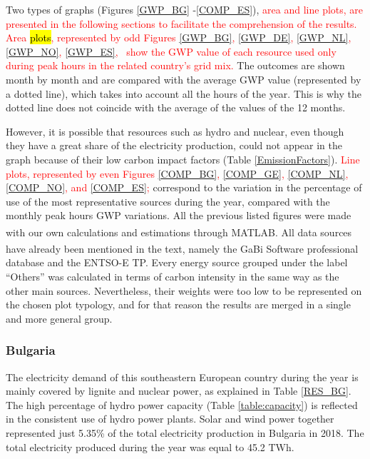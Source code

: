 Two types of graphs (Figures \ref{GWP_BG} -\ref{COMP_ES}), \textcolor{red}{area and line plots, are presented in the following sections to facilitate the comprehension of the results. Area \hl{plots}, represented by odd Figures \ref{GWP_BG}, \ref{GWP_DE}, \ref{GWP_NL}, \ref{GWP_NO}, \ref{GWP_ES}, 
~show the GWP value of each resource used only during peak hours in the related country's grid mix.} The outcomes are shown month by month and are compared with the average GWP value (represented by a dotted line), which takes into account all the hours of the year. This is why the dotted line does not coincide with the average of the values of the 12 months. %

However, it is possible that resources such as hydro and nuclear, even though they have a great share of the electricity production,  could not appear in the graph because of their low carbon impact factors (Table \ref{EmissionFactors}). \textcolor{red}{Line plots, represented by even Figures \ref{COMP_BG}, \ref{COMP_GE}, \ref{COMP_NL}, \ref{COMP_NO}, and \ref{COMP_ES};} correspond to the variation in the percentage of use of the most representative sources during the year, compared with the monthly peak hours GWP variations. {All the previous listed figures were made with our own calculations and estimations through MATLAB\textsuperscript{\textregistered}. All data sources have already been mentioned in the text, namely the  GaBi\textsuperscript{\textregistered} Software professional database and the ENTSO-E TP.} {Every energy source grouped under the label ``Others'' was calculated in terms of carbon intensity in the same way as the other main sources. Nevertheless, their weights were too low to be represented on the chosen plot typology, and for that reason the results are merged in a single and more general group}.\\





\subsubsection{Bulgaria}
The electricity demand of this southeastern European country  during the year is mainly covered by lignite and nuclear power, as explained in Table \ref{RES_BG}. The high percentage of hydro power capacity (Table \ref{table:capacity}) is reflected in the  consistent use of hydro power plants. Solar and wind power together represented  just 5.35\% of the total electricity production in Bulgaria in 2018. The total electricity produced during the year was equal to 45.2 TWh. 
 
